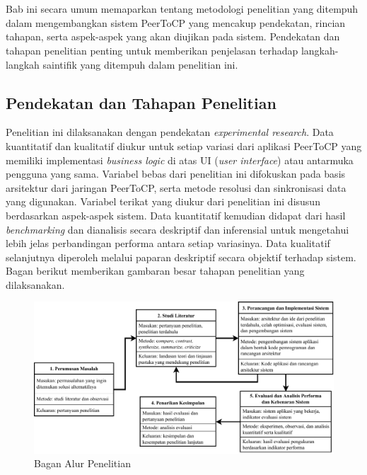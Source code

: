\chapter{\babTiga}
\label{bab:3}

Bab ini secara umum memaparkan tentang metodologi penelitian yang ditempuh dalam mengembangkan sistem PeerToCP yang mencakup pendekatan, rincian tahapan, serta aspek-aspek yang akan diujikan pada sistem. Pendekatan dan tahapan penelitian penting untuk memberikan penjelasan terhadap langkah-langkah saintifik yang ditempuh dalam penelitian ini.

\section{Pendekatan dan Tahapan Penelitian}
\label{sec:pendekatan}
Penelitian ini dilaksanakan dengan pendekatan \textit{experimental research}. Data kuantitatif dan kualitatif diukur untuk setiap variasi dari aplikasi PeerToCP yang memiliki implementasi \textit{business logic} di atas UI (\textit{user interface}) atau antarmuka pengguna yang sama. Variabel bebas dari penelitian ini difokuskan pada basis arsitektur dari jaringan PeerToCP, serta metode resolusi dan sinkronisasi data yang digunakan. Variabel terikat yang diukur dari penelitian ini disusun berdasarkan aspek-aspek sistem. Data kuantitatif kemudian didapat dari hasil \textit{benchmarking} dan dianalisis secara deskriptif dan inferensial untuk mengetahui lebih jelas perbandingan performa antara setiap variasinya. Data kualitatif selanjutnya diperoleh melalui paparan deskriptif secara objektif terhadap sistem. Bagan berikut memberikan gambaran besar tahapan penelitian yang dilaksanakan.

\begin{figure}
    \centering
    \includegraphics[scale=0.7]{assets/skripsi/Metode_Penelitian}
    \caption{Bagan Alur Penelitian}
    \label{bagan}
\end{figure}

